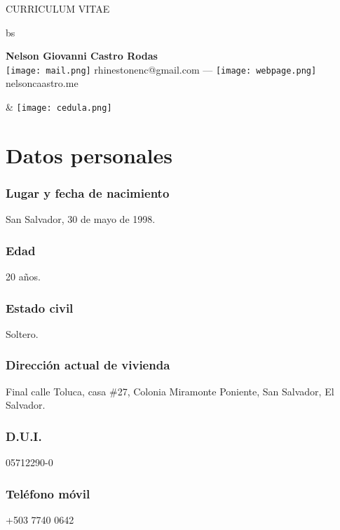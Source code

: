 \documentclass{article}
\begin{document}
    {\Huge CURRICULUM VITAE}

    \begin{table}[h]
        \centering
        \begin{tabularx}{\textwidth}{bs}
            \vspace*{\fill}
            \begin{flushleft}
                {\huge\bfseries Nelson Giovanni Castro Rodas} 
                \\ \texttt{[image: mail.png]} rhinestonenc@gmail.com  --- \texttt{[image: webpage.png]} nelsoncaastro.me
                \vspace{0.5em}
            \end{flushleft}      
            \vspace*{\fill}
            &
            \vspace*{\fill}
                \texttt{[image: cedula.png]} 
            \vspace*{\fill}
        \end{tabularx} 
    \end{table}
    \section{Datos personales}
    \subsubsection{Lugar y fecha de nacimiento}
    San Salvador, 30 de mayo de 1998.
    \subsubsection{Edad}
    20 años.
    \subsubsection{Estado civil}
    Soltero.
    \subsubsection{Dirección actual de vivienda}
    Final calle Toluca, casa \#27, Colonia Miramonte Poniente, San Salvador, El Salvador.
    \subsubsection{D.U.I.}
    05712290-0
    \subsubsection{Teléfono móvil}
    +503 7740 0642
\end{document}

